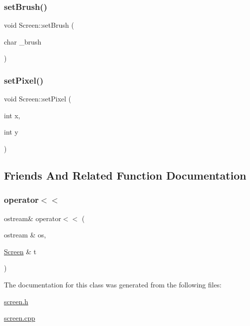 \mbox{\label{class_screen_aebc4eb6cb5acf15a0f04c1494622ab23}} 
\subsubsection{\texorpdfstring{set\+Brush()}{setBrush()}}
{\footnotesize\ttfamily void Screen\+::set\+Brush (\begin{DoxyParamCaption}\item[{char}]{\+\_\+brush }\end{DoxyParamCaption})}

\mbox{\label{class_screen_ae6bea81c57a22d226507c3c26fa95ee0}} 
\subsubsection{\texorpdfstring{set\+Pixel()}{setPixel()}}
{\footnotesize\ttfamily void Screen\+::set\+Pixel (\begin{DoxyParamCaption}\item[{int}]{x,  }\item[{int}]{y }\end{DoxyParamCaption})}



\subsection{Friends And Related Function Documentation}
\mbox{\label{class_screen_aab6a2880746bfe1b7964817cc8f0989e}} 
\subsubsection{\texorpdfstring{operator$<$$<$}{operator<<}}
{\footnotesize\ttfamily ostream\& operator$<$$<$ (\begin{DoxyParamCaption}\item[{ostream \&}]{os,  }\item[{\mbox{\hyperlink{class_screen}{Screen}} \&}]{t }\end{DoxyParamCaption})\hspace{0.3cm}{\ttfamily [friend]}}



The documentation for this class was generated from the following files\+:\begin{DoxyCompactItemize}
\item 
\mbox{\hyperlink{screen_8h}{screen.\+h}}\item 
\mbox{\hyperlink{screen_8cpp}{screen.\+cpp}}\end{DoxyCompactItemize}
